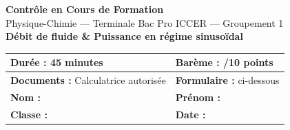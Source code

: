 \documentclass[a4paper,11pt]{article}
\begin{document}
\begin{center}
{\LARGE\bfseries\color{bleupro} Contrôle en Cours de Formation}\\[8pt]
{\large Physique-Chimie — Terminale Bac Pro ICCER — Groupement 1}\\[12pt]
{\Large\bfseries Débit de fluide \& Puissance en régime sinusoïdal}\\[20pt]

\begin{tabular}{|p{6cm}|p{6cm}|}
\hline
\textbf{Durée :} 45 minutes & \textbf{Barème :} /10 points \\
\hline
\textbf{Documents :} Calculatrice autorisée & \textbf{Formulaire :} ci-dessous \\
\hline
\textbf{Nom :} \dotfill & \textbf{Prénom :} \dotfill \\
\hline
\textbf{Classe :} \dotfill & \textbf{Date :} \dotfill \\
\hline
\end{tabular}
\end{center}

\vspace{10pt}
\end{document}
